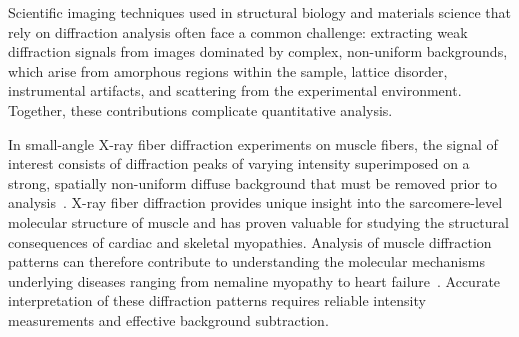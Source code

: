 \documentclass[iucr]{iucrjournals}
\begin{document}

Scientific imaging techniques used in structural biology and materials science that rely on diffraction analysis often face a common challenge: extracting weak diffraction signals from images dominated by complex, non-uniform backgrounds, which arise from amorphous regions within the sample, lattice disorder, instrumental artifacts, and scattering from the experimental environment. Together, these contributions complicate quantitative analysis.


In small-angle X-ray fiber diffraction experiments on muscle fibers, the signal of interest consists of diffraction peaks of varying intensity superimposed on a strong, spatially non-uniform diffuse background that must be removed prior to analysis~\cite{ResearchPlanMusico}. X-ray fiber diffraction provides unique insight into the sarcomere-level molecular structure of muscle and has proven valuable for studying the structural consequences of cardiac and skeletal myopathies. Analysis of muscle diffraction patterns can therefore contribute to understanding the molecular mechanisms underlying diseases ranging from nemaline myopathy to heart failure~\cite{MaIrving2022}. Accurate interpretation of these diffraction patterns requires reliable intensity measurements and effective background subtraction.

\end{document}
